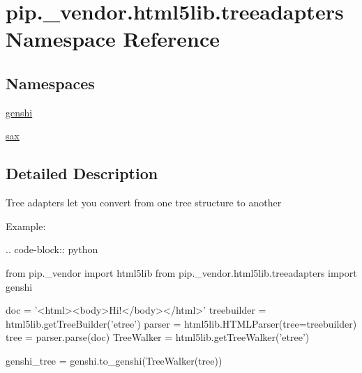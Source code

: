 \hypertarget{namespacepip_1_1__vendor_1_1html5lib_1_1treeadapters}{}\section{pip.\+\_\+vendor.\+html5lib.\+treeadapters Namespace Reference}
\label{namespacepip_1_1__vendor_1_1html5lib_1_1treeadapters}
\subsection*{Namespaces}
\begin{DoxyCompactItemize}
\item 
 \hyperlink{namespacepip_1_1__vendor_1_1html5lib_1_1treeadapters_1_1genshi}{genshi}
\item 
 \hyperlink{namespacepip_1_1__vendor_1_1html5lib_1_1treeadapters_1_1sax}{sax}
\end{DoxyCompactItemize}


\subsection{Detailed Description}
\begin{DoxyVerb}Tree adapters let you convert from one tree structure to another

Example:

.. code-block:: python

   from pip._vendor import html5lib
   from pip._vendor.html5lib.treeadapters import genshi

   doc = '<html><body>Hi!</body></html>'
   treebuilder = html5lib.getTreeBuilder('etree')
   parser = html5lib.HTMLParser(tree=treebuilder)
   tree = parser.parse(doc)
   TreeWalker = html5lib.getTreeWalker('etree')

   genshi_tree = genshi.to_genshi(TreeWalker(tree))\end{DoxyVerb}
 